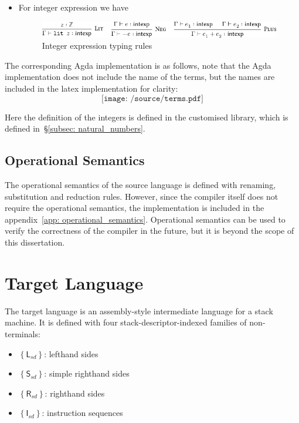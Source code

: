 \documentclass[12pt,twoside,a4paper]{report}
\theoremstyle{definition}
\theoremstyle{definition}
\theoremstyle{definition}
\theoremstyle{definition}
\newcommand{\secref}[1]{\S\ref{#1}}
\newcommand{\bracket}[1]{\left\{ #1 \right\}}
\begin{document}
\begin{itemize}
\begin{figure}[H]
                    \label{fig: rule_comm}
                \end{figure}
            \item For integer expression we have
                \begin{figure}[H]
                    \centering
                    \includegraphics{source_terms_intexp.pdf}
                    \caption{Integer expression typing rules}
                    \label{fig: rule_intexp}
                \end{figure}
        \end{itemize}

        The corresponding Agda implementation is as follows, note that the Agda implementation does not include the name of the terms, but the names are included in the latex implementation for clarity:
        \[\texttt{[image: /source/terms.pdf]}\]

        Here the definition of the integers is defined in the customised library, which is defined in~\secref{subsec: natural_numbers}.

        \subsection{Operational Semantics}
        The operational semantics of the source language is defined with renaming, substitution and reduction rules. However, since the compiler itself does not require the operational semantics, the implementation is included in the appendix~\ref{app: operational_semantics}. Operational semantics can be used to verify the correctness of the compiler in the future, but it is beyond the scope of this dissertation.


    \section{Target Language}
    The target language is an assembly-style intermediate language for a stack machine. It is defined with four stack-descriptor-indexed families of non-terminals: 
    \begin{itemize}
        \item 
            $\bracket{\textsf{L}_{sd}}$: lefthand sides
        \item 
            $\bracket{\textsf{S}_{sd}}$: simple righthand sides
        \item
            $\bracket{\textsf{R}_{sd}}$: righthand sides
        \item
            $\bracket{\textsf{I}_{sd}}$: instruction sequences
    \end{itemize}
\end{document}
